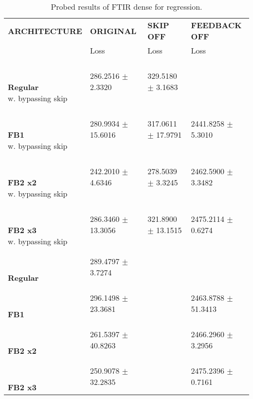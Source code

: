 
\begin{table}[ht]
    \centering
    \begin{tabular}{|>{\columncolor{gray!05}}l|l|l|l|}
        \hline
        \rowcolor{gray!20}
        \textbf{\footnotesize ARCHITECTURE} & \textbf{\footnotesize ORIGINAL} & \textbf{\footnotesize SKIP OFF} & \textbf{\footnotesize FEEDBACK OFF} \\

        \rowcolor{gray!20}
        & {\footnotesize Loss} & {\footnotesize Loss} & {\footnotesize Loss} \\
        \hline
\shortstack[l]{\\ {} \\ \textbf{Regular}\\{w. bypassing skip}} & 286.2516 $\pm$ 2.3320 & 329.5180 $\pm$ 3.1683 &  \\
 \hline 
\shortstack[l]{\\ {} \\ \textbf{FB1}\\{w. bypassing skip}} & 280.9934 $\pm$ 15.6016 & 317.0611 $\pm$ 17.9791 & 2441.8258 $\pm$ 5.3010 \\
 \hline 
\shortstack[l]{\\ {} \\ \textbf{FB2 x2}\\{w. bypassing skip}} & 242.2010 $\pm$ 4.6346 & 278.5039 $\pm$ 3.3245 & 2462.5900 $\pm$ 3.3482 \\
 \hline 
\shortstack[l]{\\ {} \\ \textbf{FB2 x3}\\{w. bypassing skip}} & 286.3460 $\pm$ 13.3056 & 321.8900 $\pm$ 13.1515 & 2475.2114 $\pm$ 0.6274 \\
 \hline 
\shortstack[l]{\\ {} \\ \textbf{Regular}\\{}} & 289.4797 $\pm$ 3.7274 &  &  \\
 \hline 
\shortstack[l]{\\ {} \\ \textbf{FB1}\\{}} & 296.1498 $\pm$ 23.3681 &  & 2463.8788 $\pm$ 51.3413 \\
 \hline 
\shortstack[l]{\\ {} \\ \textbf{FB2 x2}\\{}} & 261.5397 $\pm$ 40.8263 &  & 2466.2960 $\pm$ 3.2956 \\
 \hline 
\shortstack[l]{\\ {} \\ \textbf{FB2 x3}\\{}} & 250.9078 $\pm$ 32.2835 &  & 2475.2396 $\pm$ 0.7161 \\
 \hline 

    \end{tabular}
    \caption{Probed results of FTIR dense for regression.}
    \label{tab:ftir-mlp-regression}
\end{table}
